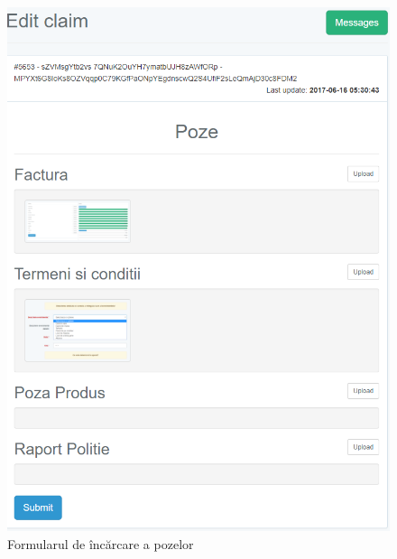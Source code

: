 	\begin{figure}
		\includegraphics[width=\linewidth]{../imagini/report_incarcare_poze.png}
		\caption{Formularul de încărcare a pozelor}
		\label{fig:report_incarcare_poze}
	\end{figure}


